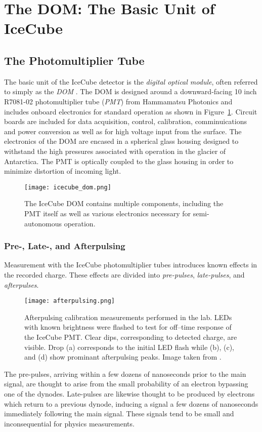 \section{The DOM: The Basic Unit of IceCube}

\label{subsec:pmt}
\subsection{The Photomultiplier Tube}
The basic unit of the IceCube detector is the \emph{digital optical module}, often referred to simply as the \emph{DOM} \cite{Description-IceCube}.
The DOM is designed around a downward-facing 10 inch R7081-02 photomultiplier tube (\emph{PMT}) from Hammamatsu Photonics \cite{IceCube-PMT,IceCube-PMT-Hammamatsu} and includes onboard electronics for standard operation as shown in Figure~\ref{fig:icecube_dom}. 
Circuit boards are included for data acquisition, control, calibration, comminuications and power conversion as well as for high voltage input from the surface.
The electronics of the DOM are encased in a spherical glass housing designed to withstand the high pressures associated with operation in the glacier of Antarctica.
The PMT is optically coupled to the glass housing in order to minimize distortion of incoming light. 

\begin{figure}
\centering
\texttt{[image: icecube\_dom.png]}
\caption{The IceCube DOM contains multiple components, including the PMT itself as well as various electronics necessary for semi-autonomous operation.}
\label{fig:icecube_dom}
\end{figure}

\label{subsubsec:pulsing}
\subsubsection{Pre-, Late-, and Afterpulsing}
Measurement with the IceCube photomultiplier tubes introduces known effects in the recorded charge.
These effects are divided into \emph{pre-pulses}, \emph{late-pulses}, and \emph{afterpulses}.

\begin{figure}
\centering
\texttt{[image: afterpulsing.png]} 
\caption{Afterpulsing calibration measurements performed in the lab. LEDs with known brightness were flashed to test for off–time response of the IceCube PMT. Clear dips, corresponding to detected charge, are visible. Drop (a) corresponds to the initial LED flash while (b), (c), and (d) show prominant afterpulsing peaks. Image taken from \cite{IceCube-PMT}.}
\end{figure}
The pre-pulses, arriving within a few dozens of nanoseconds prior to the main signal, are thought to arise from the small probability of an electron bypassing one of the dynodes. 
Late-pulses are likewise thought to be produced by electrons which return to a previous dynode, inducing a signal a few dozens of nanoseconds immediately following the main signal.
These signals tend to be small and inconsequential for physics measurements.

